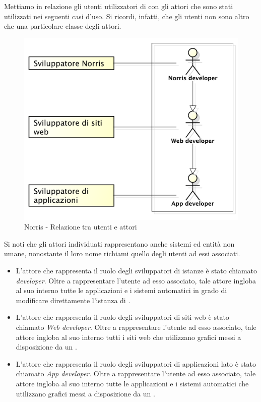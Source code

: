 	Mettiamo in relazione gli utenti utilizzatori di  con gli attori che sono stati utilizzati nei seguenti casi d'uso. Si ricordi, infatti, che gli utenti non sono altro che una particolare classe degli attori.
	\begin{figure}[H]
		\centering
		\includegraphics[scale=0.4]{Pics/UtentiAttoriNorris}
		\caption{Norris - Relazione tra utenti e attori}
	\end{figure}
	Si noti che gli attori individuati rappresentano anche sistemi ed entità non umane, nonostante il loro nome richiami quello degli utenti ad essi associati.
	\begin{itemize}
		\item L'attore che rappresenta il ruolo degli sviluppatori di istanze  è stato chiamato \emph{ developer}. Oltre a rappresentare l'utente ad esso associato, tale attore ingloba al suo interno tutte le applicazioni e i sistemi automatici in grado di modificare direttamente l'istanza di .
		\item L'attore che rappresenta il ruolo degli sviluppatori di siti web è stato chiamato \emph{Web developer}. Oltre a rappresentare l'utente ad esso associato, tale attore ingloba al suo interno tutti i siti web che utilizzano grafici messi a disposizione da un  .
		\item L'attore che rappresenta il ruolo degli sviluppatori di applicazioni lato  è stato chiamato \emph{App developer}. Oltre a rappresentare l'utente ad esso associato, tale attore ingloba al suo interno tutte le applicazioni e i sistemi automatici che utilizzano grafici messi a disposizione da un  .
	\end{itemize}
	

